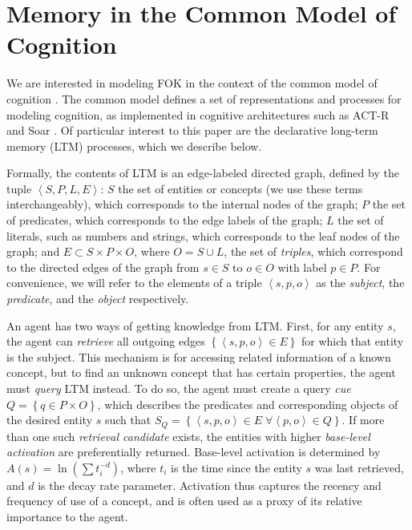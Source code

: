 \documentclass[10pt,letterpaper]{article}
\newcommand{\fixme}[2][]{#2}
\renewcommand{\fixme}[2][]{\textcolor{red}{#2}}
\newcommand{\setof}[1]{\left \{ #1 \right \}}
\newcommand{\tuple}[1]{\left \langle #1 \right \rangle }
\begin{document}

\section{Memory in the Common Model of Cognition}

We are interested in modeling FOK in the context of the common model of cognition \cite{Laird2017AStandardModel}.
The common model defines a set of representations and processes for modeling cognition, as implemented in cognitive architectures such as ACT-R and Soar \cite{Anderson2007HowCanThe,Laird2012TheSoarCognitive}.
Of particular interest to this paper are the declarative long-term memory (LTM) processes, which we describe below.

Formally, the contents of LTM is an edge-labeled directed graph, defined by the tuple $\tuple{S, P, L, E}$:
$S$ the set of entities or concepts (we use these terms interchangeably), which corresponds to the internal nodes of the graph;
$P$ the set of predicates, which corresponds to the edge labels of the graph;
$L$ the set of literals, such as numbers and strings, which corresponds to the leaf nodes of the graph;
and $E{\subset}S{\times}P{\times}O$, where $O=S{\cup}L$, the set of \emph{triples}, which correspond to the directed edges of the graph from $s{\in}S$ to $o{\in}O$ with label $p{\in}P$.
For convenience, we will refer to the elements of a triple $\tuple{s, p, o}$ as the \emph{subject}, the \emph{predicate}, and the \emph{object} respectively.

An agent has two ways of getting knowledge from LTM.
First, for any entity $s$, the agent can \emph{retrieve} all outgoing edges $\setof{\tuple{s, p, o}{\in}E}$ for which that entity is the subject.
This mechanism is for accessing related information of a known concept, but to find an unknown concept that has certain properties, the agent must \emph{query} LTM instead.
To do so, the agent must create a query \emph{cue} $Q = \setof{q{\in}P{\times}O}$, which describes the predicates and corresponding objects of the desired entity $s$ such that $S_Q = \setof{\tuple{s, p, o}{\in}E \; \forall \tuple{p, o}{\in}Q}$.
If more than one such \emph{retrieval candidate} exists, the entities with higher \emph{base-level activation} are preferentially returned.
Base-level activation is determined by $A(s) = \ln (\sum {t_i^{-d}})$, where $t_i$ is the time since the entity $s$ was last retrieved, and $d$ is the decay rate parameter.
Activation thus captures the recency and frequency of use of a concept, and is often used as a proxy of its relative importance to the agent.
\fixme[Talk about query vs. retrievals here]{}
\end{document}
